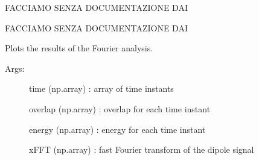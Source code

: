 \documentclass[letterpaper,10pt,english]{sphinxmanual}
\begin{document}
\begin{fulllineitems}
\begin{fulllineitems}
\end{fulllineitems}


\begin{fulllineitems}
\label{\detokenize{index:do.GHF.plot_fft_dipole_comparison}}
FACCIAMO SENZA DOCUMENTAZIONE DAI

\end{fulllineitems}


\begin{fulllineitems}
\label{\detokenize{index:do.GHF.plot_fft_overlap_comparison}}
FACCIAMO SENZA DOCUMENTAZIONE DAI

\end{fulllineitems}


\begin{fulllineitems}
\label{\detokenize{index:do.GHF.plot_fourier_analysis}}
Plots the results of the Fourier analysis.
\begin{description}
\item[{Args:}] \leavevmode
time (np.array) : array of time instants

overlap (np.array) : overlap for each time instant

energy (np.array) : energy for each time instant

xFFT (np.array) : fast Fourier transform of the dipole signal


\end{description}
\end{fulllineitems}
\end{fulllineitems}
\end{document}
